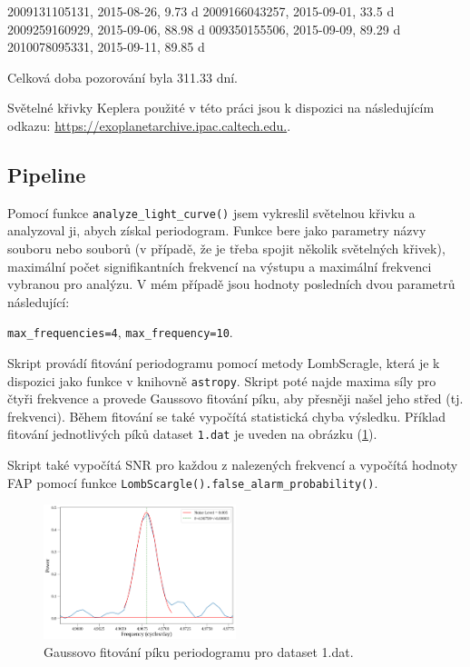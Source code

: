 \documentclass[a4paper,11pt,twocolumn]{article}
\begin{document}
            \begin{center}
                2009131105131, 2015-08-26, 9.73 d
                2009166043257, 2015-09-01, 33.5 d
                2009259160929, 2015-09-06, 88.98 d
                009350155506, 2015-09-09, 89.29 d
                2010078095331, 2015-09-11, 89.85 d
            \end{center}

            Celková doba pozorování byla 311.33 dní.

            Světelné křivky Keplera použité v této práci jsou k dispozici na následujícím odkazu: \url{https://exoplanetarchive.ipac.caltech.edu.}.

        \subsection{Pipeline}
            Pomocí funkce \texttt{analyze\_light\_curve()} jsem vykreslil světelnou křivku a analyzoval ji, abych získal periodogram. Funkce bere jako parametry názvy souboru nebo souborů (v případě, že je třeba spojit několik světelných křivek), maximální počet signifikantních frekvencí na výstupu a maximální frekvenci vybranou pro analýzu. V mém případě jsou hodnoty posledních dvou parametrů následující: 
            
            \begin{center}
                \texttt{max\_frequencies=4}, \texttt{max\_frequency=10}.
            \end{center}

            Skript provádí fitování periodogramu pomocí metody LombScragle, která je k dispozici jako funkce v knihovně \texttt{astropy}. Skript poté najde maxima síly pro čtyři frekvence a provede Gaussovo fitování píku, aby přesněji našel jeho střed (tj. frekvenci). Během fitování se také vypočítá statistická chyba výsledku. Příklad fitování jednotlivých píků dataset \texttt{1.dat} je uveden na obrázku (\ref{fig:1_ls_gaussian}).
            
            Skript také vypočítá SNR pro každou z nalezených frekvencí a vypočítá hodnoty FAP pomocí funkce \texttt{LombScargle().false\_alarm\_probability()}.

            \begin{figure}
                \centering
                \includegraphics[width=0.5\textwidth]{1_ls_gaussian.png}
                \caption{Gaussovo fitování píku periodogramu pro dataset 1.dat.}
                \label{fig:1_ls_gaussian}
            \end{figure}
            
\end{document}
